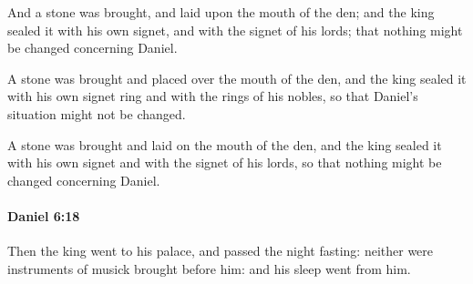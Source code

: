 			\begin{versebox}
					\item[BHS] 
					\item[LXX] 
					\item[ASV] And a stone was brought, and laid upon the mouth of the den; and the king sealed it with his own signet, and with the signet of his lords; that nothing might be changed concerning Daniel.
					\item[NIV] A stone was brought and placed over the mouth of the den, and the king sealed it with his own signet ring and with the rings of his nobles, so that Daniel’s situation might not be changed.
					\item[NRSV] A stone was brought and laid on the mouth of the den, and the king sealed it with his own signet and with the signet of his lords, so that nothing might be changed concerning Daniel.
			\end{versebox}

		\paragraph{Daniel 6:18} %
			\label{DANIEL-6-18}

			Then the king went to his palace, and passed the night fasting: neither were instruments of musick brought before him: and his sleep went from him.

